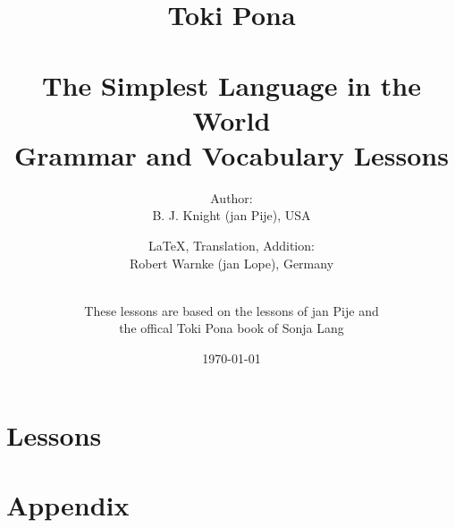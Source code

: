 \documentclass[a4paper, 10pt]{book}
\begin{document}
\setlength{\topmargin}{-19mm}
\setlength{\headheight}{5mm}
\setlength{\headsep}{10mm}
\setlength{\textheight}{245mm}
\setlength{\textwidth}{155mm}
\setlength{\oddsidemargin}{5mm}
\setlength{\evensidemargin}{-1mm}
\setlength{\footskip}{20mm}
\setlength{\parindent}{0mm}
\setlength{\parskip}{2.0ex plus 1.0ex minus 0.5ex}
\batchmode
\title{
Toki Pona \\  \\ 
The Simplest Language in the World \\ 
Grammar and Vocabulary Lessons \\
}
\author{
Author: \\ B. J. Knight (jan Pije), USA \cite{www:Pije:01} \\  
\and
\LaTeX, Translation, Addition: \\ Robert Warnke (jan Lope), Germany \cite{www:rowa:01} \\ 
\and
 \\ These lessons are based on the lessons of jan Pije and \\ the offical Toki Pona book of Sonja Lang \cite{www:tokipona.org} \\
}

%
\date
\today
\maketitle
\tableofcontents
%
\chapter{Lessons}

















%


%
\appendix
\chapter{Appendix}
%
%






%


\printindex
\end{document}
